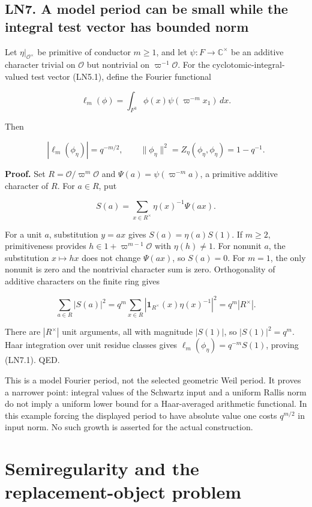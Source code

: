 \documentclass[11pt,a4paper]{article}
\theoremstyle{definition}
\begin{document}
\subsection{LN7. A model period can be small while the integral test
vector has bounded
norm}\label{local-fourier-period-ln7.-a-model-period-can-be-small-while-the-integral-test-vector-has-bounded-norm}

Let \(\eta|_{\mathcal O^\times}\) be primitive of conductor \(m\ge1\),
and let \(\psi:F\to\mathbb C^\times\) be an additive character trivial
on \(\mathcal O\) but nontrivial on \(\varpi^{-1}\mathcal O\). For the
cyclotomic-integral-valued test vector (LN5.1), define the Fourier
functional

\[
 \ell_m(\phi)=\int_{F^3}\phi(x)\psi(\varpi^{-m}x_1)\,dx.
\]

Then

\[
 |\ell_m(\phi_\eta)|=q^{-m/2},
 \qquad \|\phi_\eta\|^2=Z_\eta(\phi_\eta,\phi_\eta)=1-q^{-1}.
 \tag{LN7.1}
\]

\textbf{Proof.} Set \(R=\mathcal O/\varpi^m\mathcal O\) and
\(\Psi(a)=\psi(\varpi^{-m}a)\), a primitive additive character of \(R\).
For \(a\in R\), put

\[
 S(a)=\sum_{x\in R^\times}\eta(x)^{-1}\Psi(ax).
\]

For a unit \(a\), substitution \(y=ax\) gives \(S(a)=\eta(a)S(1)\). If
\(m\ge2\), primitiveness provides \(h\in1+\varpi^{m-1}\mathcal O\) with
\(\eta(h)\ne1\). For nonunit \(a\), the substitution \(x\mapsto hx\)
does not change \(\Psi(ax)\), so \(S(a)=0\). For \(m=1\), the only
nonunit is zero and the nontrivial character sum is zero. Orthogonality
of additive characters on the finite ring gives

\[
 \sum_{a\in R}|S(a)|^2
 =q^m\sum_{x\in R}|\mathbf1_{R^\times}(x)\eta(x)^{-1}|^2
 =q^m|R^\times|.
\]

There are \(|R^\times|\) unit arguments, all with magnitude \(|S(1)|\),
so \(|S(1)|^2=q^m\). Haar integration over unit residue classes gives
\(\ell_m(\phi_\eta)=q^{-m}S(1)\), proving (LN7.1). QED.

This is a model Fourier period, not the selected geometric Weil period.
It proves a narrower point: integral values of the Schwartz input and a
uniform Rallis norm do not imply a uniform lower bound for a
Haar-averaged arithmetic functional. In this example forcing the
displayed period to have absolute value one costs \(q^{m/2}\) in input
norm. No such growth is asserted for the actual construction.

\section{Semiregularity and the replacement-object problem}
\end{document}
